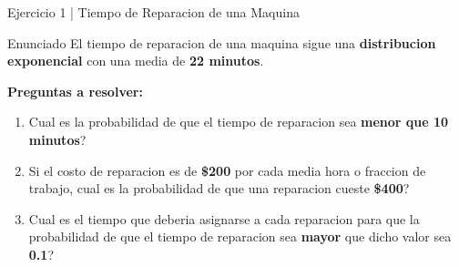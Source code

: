 \documentclass[10pt]{beamer}
\begin{document}
\begin{frame}{Ejercicio 1 | Tiempo de Reparacion de una Maquina}
\begin{block}{Enunciado}
\justifying
El tiempo de reparacion de una maquina sigue una \textbf{distribucion exponencial} con una media de \textbf{22 minutos}.
\end{block}

\vspace{0.2cm}
\textbf{Preguntas a resolver:}
\begin{enumerate}
    \item Cual es la probabilidad de que el tiempo de reparacion sea \textbf{menor que 10 minutos}?
    \item Si el costo de reparacion es de \textbf{\$200} por cada media hora o fraccion de trabajo, cual es la probabilidad de que una reparacion cueste \textbf{\$400}?
    \item Cual es el tiempo que deberia asignarse a cada reparacion para que la probabilidad de que el tiempo de reparacion sea \textbf{mayor} que dicho valor sea \textbf{0.1}?
\end{enumerate}

\vspace{0.2cm}
\begin{center}
\end{center}
\end{frame}
\end{document}
